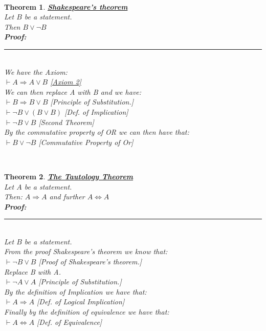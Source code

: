 \documentclass[12pt]{extarticle}
\theoremstyle{plain}
\newtheorem{thm}{Theorem}[section]
\theoremstyle{plain}
\theoremstyle{plain}
\theoremstyle{Definition}
\theoremstyle{Definition}
\theoremstyle{plain}
\theoremstyle{plain}
\newcommand{\cut}[0]{\noindent\framebox[\linewidth]{\rule{\linewidth}{2pt}}\\}
\newcommand{\prof}[0]{	\noindent \textbf{Proof:} \rule{500pt}{2pt} \\ }
\begin{document}
\cut
\begin{thm} \underline{\textbf{Shakespeare's theorem}} \\ 
	Let $B$ be a statement. \\
	Then $B \lor \lnot B$ \\ 
	\prof
	We have the Axiom: \\
	$\vdash A \Rightarrow A \lor B$ \hfill \hyperlink{Axioms}{[Axiom 2]} \\ 
	We can then replace A with B and  we have: \\ 
	$\vdash B \Rightarrow B \lor B$ \hfill [Principle of Substitution.] \\ 
	$\vdash \lnot B \lor (B \lor B)$ \hfill [Def. of Implication]\\ 
	$\vdash \lnot B \lor B$ \hfill [Second Theorem] \\ 
	By the commutative property of OR we can then have that: \\ 
	$\vdash B \lor \lnot B$ \hfill [Commutative Property of Or] 
\end{thm}
\cut
\begin{thm} \underline{\textbf{The Tautology Theorem}} \\ 
	Let $A$ be a statement. \\ 
	Then: $A \Rightarrow A$ and further $A \Leftrightarrow A$ \\
	\prof
	Let $B$ be a statement. \\ 
	From the proof Shakespeare's theorem we know that: \\
	$\vdash \lnot B \lor B$ \hfill [Proof of Shakespeare's theorem.] \\ 
	Replace B with A. \\ 
	$\vdash \lnot A \lor A$ \hfill [Principle of Substitution.] \\
	By the definition of Implication we have that: \\ 
	$\vdash A \Rightarrow A$ \hfill [Def. of Logical Implication] \\
	Finally by the definition of equivalence we have that: \\ 
	$\vdash A \Leftrightarrow A$ \hfill [Def. of Equivalence] 	
\end{thm}
\cut
\end{document}
